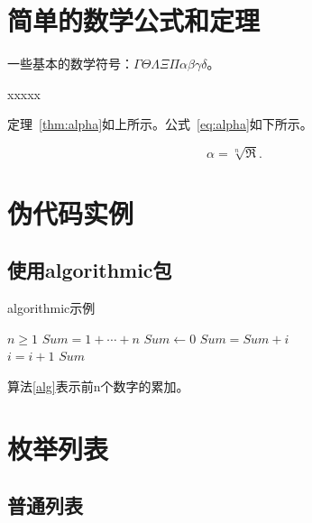 \section{简单的数学公式和定理}

一些基本的数学符号：$\Gamma\Theta\Lambda\Xi\Pi\alpha\beta\gamma\delta$。

\begin{theo} [存在性定理]
\label{thm:alpha}
    xxxxx
\end{theo}

定理~\ref{thm:alpha}如上所示。公式~\ref{eq:alpha}如下所示。

\begin{equation}
\label{eq:alpha}
    \alpha=\sqrt[n]{\Re}.
\end{equation}


\section{伪代码实例}

\subsection{使用algorithmic包}

\begin{algorithm}[!ht]
\caption{algorithmic示例}
\begin{algorithmic}[1] %
    \REQUIRE $n \geq 1$                  %
    \ENSURE $Sum = 1 + \cdots + n$       %
    \STATE $Sum \leftarrow 0$            %
    \ELSE
            \STATE $Sum = Sum + i$\\
            \STATE $i = i + 1$
        \ENDFOR
    \ENDIF
    \RETURN $Sum$
\end{algorithmic}
\label{alg}
\end{algorithm}

算法\ref{alg}表示前n个数字的累加。


\section{枚举列表}

\subsection{普通列表}

